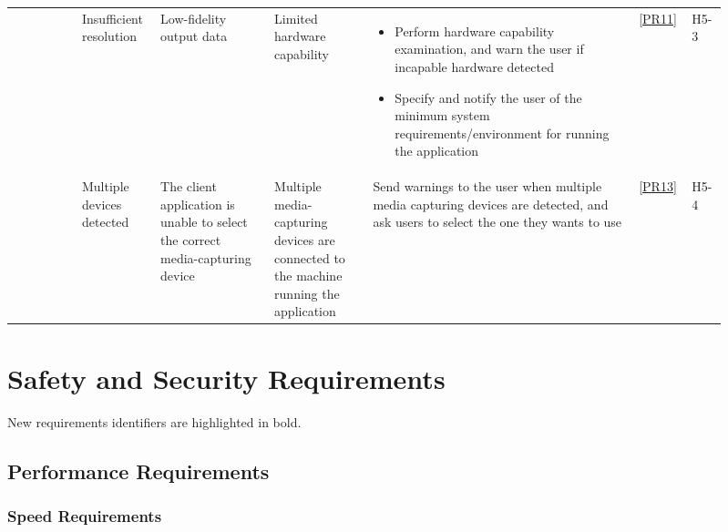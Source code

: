 \documentclass{article}
\begin{document}
\begin{landscape}
\begin{longtable}[h]{L{0.09\linewidth}L{0.1\linewidth}L{0.15\linewidth}L{0.13\linewidth}L{0.35\linewidth}L{0.05\linewidth}L{0.04\linewidth}}
    & Insufficient resolution
    & Low-fidelity output data
    & Limited hardware capability
    & \vspace{-1.1\topsep}
      \begin{itemize}[nosep,topsep=0pt,leftmargin=10pt]
      \item Perform hardware capability examination, and warn the user if incapable
        hardware detected
      \item Specify and notify the user of the minimum system
        requirements/environment for running the application
      \end{itemize}
      \vspace{-1.1\topsep}
    & \ref{PR11}
    & H5-3\\
    & Multiple devices detected
    & The client application is unable to select the correct media-capturing device
    & Multiple media-capturing devices are connected to the machine running the application
    & Send warnings to the user when multiple media capturing devices are detected, and ask users to select the one they wants to use
    & \ref{PR13}
    & H5-4\\
  \end{longtable}
\end{landscape}
\restoregeometry

\section{Safety and Security Requirements}

New requirements identifiers are highlighted in bold.

\subsection{Performance Requirements}

\subsubsection{Speed Requirements}
\end{document}
